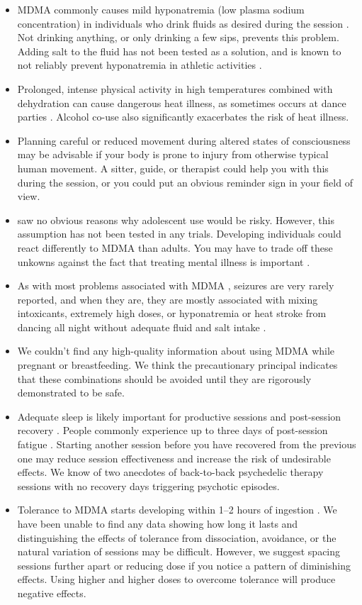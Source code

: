 \documentclass[12pt,letterpaper]{book}
\begin{document}
\begin{itemize}
    \item MDMA commonly causes mild hyponatremia (low plasma sodium concentration) in individuals who drink fluids as desired during the session \cite{atilaHyponatremia,baggottWater}. Not drinking anything, or only drinking a few sips, prevents this problem. Adding salt to the fluid has not been tested as a solution, and is known to not reliably prevent hyponatremia in athletic activities \cite{hew2008statement}.
    \item Prolonged, intense physical activity in high temperatures combined with dehydration can cause dangerous heat illness, as sometimes occurs at dance parties \cite{vanOverheatingAlcohol}. Alcohol co-use also significantly exacerbates the risk of heat illness.
    \item Planning careful or reduced movement during altered states of consciousness may be advisable if your body is prone to injury from otherwise typical human movement. A sitter, guide, or therapist could help you with this during the session, or you could put an obvious reminder sign in your field of view.
    \item \textcite{kangaslampiAdolescent} saw no obvious reasons why adolescent use would be risky. However, this assumption has not been tested in any trials. Developing individuals could react differently to MDMA than adults. You may have to trade off these unkowns against the fact that treating mental illness is important \cite{mitchellMDMAClinicalTrial}.
    \item As with most problems associated with MDMA \cite{riggDeaths}, seizures are very rarely reported, and when they are, they are mostly associated with mixing intoxicants, extremely high doses, or hyponatremia or heat stroke from dancing all night without adequate fluid and salt intake \cite{freidelSeizures}.
    \item We couldn't find any high-quality information about using MDMA while pregnant or breastfeeding. We think the precautionary principal indicates that these combinations should be avoided until they are rigorously demonstrated to be safe.
    \item Adequate sleep is likely important for productive sessions and post-session recovery \cite{simon2020sleep}. People commonly experience up to three days of post-session fatigue \cite{liechtiGender}. Starting another session before you have recovered from the previous one may reduce session effectiveness and increase the risk of undesirable effects. We know of two anecdotes of back-to-back psychedelic therapy sessions with no recovery days triggering psychotic episodes.
    \item Tolerance to MDMA starts developing within 1–2 hours of ingestion \cite{farreTolerance,parrottTolerance}. We have been unable to find any data showing how long it lasts and distinguishing the effects of tolerance from dissociation, avoidance, or the natural variation of sessions may be difficult. However, we suggest spacing sessions further apart or reducing dose if you notice a pattern of diminishing effects. Using higher and higher doses to overcome tolerance will produce negative effects.
\end{itemize}
\end{document}
